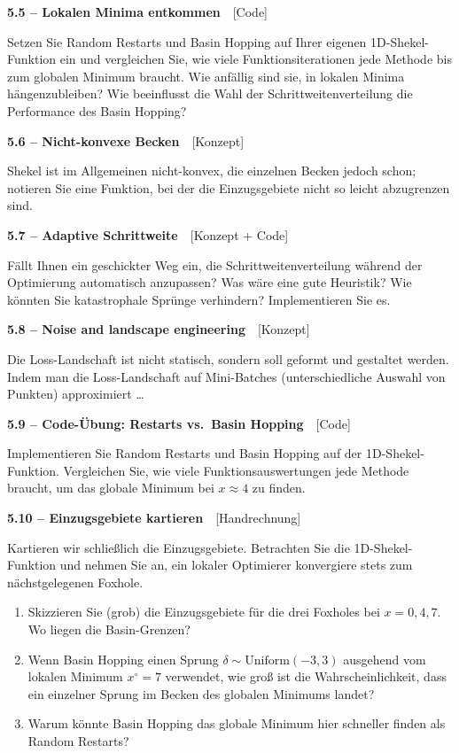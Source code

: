 \documentclass[a4paper,10pt]{article}
\newcommand{\aufg}[2]{%
  \par\vspace{3pt}
  {\bfseries\color{accent2} #1}~~{\footnotesize\color{accent2}[#2]}\par\vspace{1pt}}
\begin{document}
\aufg{5.5 \;--\; Lokalen Minima entkommen}{Code}
Setzen Sie Random Restarts und Basin Hopping auf Ihrer eigenen 1D-Shekel-Funktion ein
und vergleichen Sie, wie viele Funktionsiterationen jede Methode bis zum globalen
Minimum braucht. Wie anfällig sind sie, in lokalen Minima hängenzubleiben? Wie
beeinflusst die Wahl der Schrittweitenverteilung die Performance des Basin Hopping?

\aufg{5.6 \;--\; Nicht-konvexe Becken}{Konzept}
Shekel ist im Allgemeinen nicht-konvex, die einzelnen Becken jedoch schon; notieren
Sie eine Funktion, bei der die Einzugsgebiete nicht so leicht abzugrenzen sind.

\aufg{5.7 \;--\; Adaptive Schrittweite}{Konzept + Code}
Fällt Ihnen ein geschickter Weg ein, die Schrittweitenverteilung während der
Optimierung automatisch anzupassen? Was wäre eine gute Heuristik? Wie könnten Sie
katastrophale Sprünge verhindern? Implementieren Sie es.

\aufg{5.8 \;--\; Noise and landscape engineering}{Konzept}
Die Loss-Landschaft ist nicht statisch, sondern soll geformt und gestaltet werden.
Indem man die Loss-Landschaft auf Mini-Batches (unterschiedliche Auswahl von Punkten)
approximiert \dots

\aufg{5.9 \;--\; Code-Übung: Restarts vs.\ Basin Hopping}{Code}
Implementieren Sie Random Restarts und Basin Hopping auf der 1D-Shekel-Funktion.
Vergleichen Sie, wie viele Funktionsauswertungen jede Methode braucht, um das globale
Minimum bei $x\approx4$ zu finden.

\aufg{5.10 \;--\; Einzugsgebiete kartieren}{Handrechnung}
Kartieren wir schließlich die Einzugsgebiete. Betrachten Sie die 1D-Shekel-Funktion
und nehmen Sie an, ein lokaler Optimierer konvergiere stets zum nächstgelegenen
Foxhole.
\begin{enumerate}
  \item[(a)] Skizzieren Sie (grob) die Einzugsgebiete für die drei Foxholes bei
        $x=0,4,7$. Wo liegen die Basin-Grenzen?
  \item[(b)] Wenn Basin Hopping einen Sprung $\delta\sim\mathrm{Uniform}(-3,3)$
        ausgehend vom lokalen Minimum $x^\circ=7$ verwendet, wie groß ist die
        Wahrscheinlichkeit, dass ein einzelner Sprung im Becken des globalen Minimums
        landet?
  \item[(c)] Warum könnte Basin Hopping das globale Minimum hier schneller finden als
        Random Restarts?
\end{enumerate}
\end{document}
